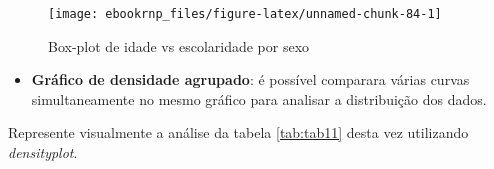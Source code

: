 \documentclass[11pt,]{style/krantz}
\makeatletter
\newenvironment{Shaded}{\begin{snugshade}}{\end{snugshade}}
\newcommand{\DataTypeTok}[1]{\textcolor[rgb]{0.13,0.29,0.53}{#1}}
\newcommand{\KeywordTok}[1]{\textcolor[rgb]{0.13,0.29,0.53}{\textbf{#1}}}
\newcommand{\NormalTok}[1]{#1}
\newcommand{\OperatorTok}[1]{\textcolor[rgb]{0.81,0.36,0.00}{\textbf{#1}}}
\newcommand{\OtherTok}[1]{\textcolor[rgb]{0.56,0.35,0.01}{#1}}
\newcommand{\StringTok}[1]{\textcolor[rgb]{0.31,0.60,0.02}{#1}}
\providecommand{\tightlist}{%
  \setlength{\itemsep}{0pt}\setlength{\parskip}{0pt}}
\newenvironment{kframe}{%
\medskip{}
\setlength{\fboxsep}{.8em}
 \def\at@end@of@kframe{}%
 \ifinner\ifhmode%
  \def\at@end@of@kframe{\end{minipage}}%
  \begin{minipage}{\columnwidth}%
 \fi\fi%
 \def\FrameCommand##1{\hskip\@totalleftmargin \hskip-\fboxsep
 \colorbox{shadecolor}{##1}\hskip-\fboxsep
     \hskip-\linewidth \hskip-\@totalleftmargin \hskip\columnwidth}%
 \MakeFramed {\advance\hsize-\width
   \@totalleftmargin\z@ \linewidth\hsize
   \@setminipage}}%
 {\par\unskip\endMakeFramed%
 \at@end@of@kframe}
\renewenvironment{Shaded}{\begin{kframe}}{\end{kframe}}
\theoremstyle{definition}
\theoremstyle{definition}
\theoremstyle{definition}
\theoremstyle{remark}
\let\BeginKnitrBlock\begin \let\EndKnitrBlock\end
\makeatother
\begin{document}
\begin{Shaded}
\end{Shaded}

\begin{figure}[H]

{\centering \texttt{[image: ebookrnp\_files/figure-latex/unnamed-chunk-84-1]}

}

\caption{Box-plot de idade vs escolaridade por sexo}\label{fig:unnamed-chunk-84}
\end{figure}

\begin{itemize}
\tightlist
\item
  \textbf{Gráfico de densidade agrupado}: é possível comparara várias curvas simultaneamente no mesmo gráfico para analisar a distribuição dos dados.
\end{itemize}

\BeginKnitrBlock{example}
\protect\hypertarget{exm:unnamed-chunk-85}{}{\label{exm:unnamed-chunk-85} }Represente visualmente a análise da tabela \ref{tab:tab11} desta vez utilizando \emph{densityplot}.
\EndKnitrBlock{example}
\end{document}
